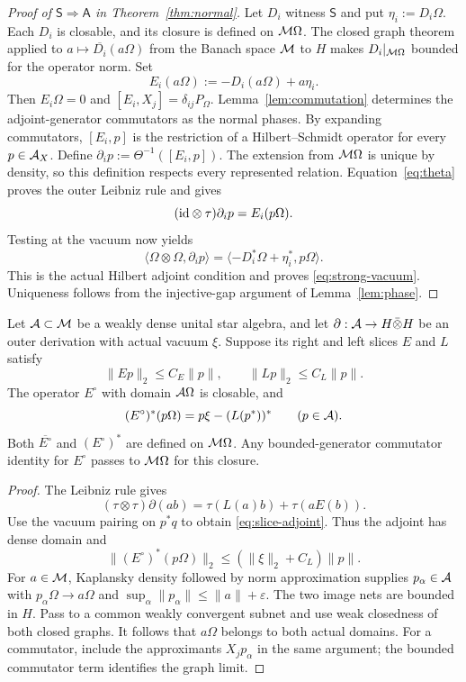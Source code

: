 \begin{proof}[Proof of $\mathsf S\Rightarrow\mathsf A$ in Theorem~\ref{thm:normal}]
Let $D_i$ witness $\mathsf S$ and put $\eta_i:=D_i\Omega$.
Each $D_i$ is closable, and its closure is defined on $\mathcal M\Omega$.
The closed graph theorem applied to $a\mapsto\overline{D_i}(a\Omega)$ from the Banach space $\mathcal M$ to $H$ makes $D_i|_{\mathcal M\Omega}$ bounded for the operator norm.
Set
\[
 E_i(a\Omega):=-D_i(a\Omega)+a\eta_i.
\]
Then $E_i\Omega=0$ and $[E_i,X_j]=\delta_{ij}P_\Omega$.
Lemma~\ref{lem:commutation} determines the adjoint-generator commutators as the normal phases.
By expanding commutators, $[E_i,p]$ is the restriction of a Hilbert--Schmidt operator for every $p\in\mathcal A_X$.
Define $\partial_i p:=\Theta^{-1}([E_i,p])$.
The extension from $\mathcal M\Omega$ is unique by density, so this definition respects every represented relation.
Equation~\eqref{eq:theta} proves the outer Leibniz rule and gives
\[
 (\mathrm{id}\otimes\tau)\partial_i p=E_i(p\Omega).
\]
Testing at the vacuum now yields
\[
 \langle\Omega\otimes\Omega,\partial_i p\rangle
 =\langle-D_i^*\Omega+\eta_i^*,p\Omega\rangle.
\]
This is the actual Hilbert adjoint condition and proves \eqref{eq:strong-vacuum}.
Uniqueness follows from the injective-gap argument of Lemma~\ref{lem:phase}.
\end{proof}

\begin{lemma}\label{lem:graph}
Let $\mathcal A\subset\mathcal M$ be a weakly dense unital star algebra, and let $\partial:\mathcal A\to H\bar\otimes H$ be an outer derivation with actual vacuum $\xi$.
Suppose its right and left slices $E$ and $L$ satisfy
\[
 \|Ep\|_2\le C_E\|p\|,\qquad \|Lp\|_2\le C_L\|p\|.
\]
The operator $E^\circ$ with domain $\mathcal A\Omega$ is closable, and
\begin{equation}\label{eq:slice-adjoint}
 (E^\circ)^*(p\Omega)=p\xi-(L(p^*))^*\qquad(p\in\mathcal A).
\end{equation}
Both $\overline{E^\circ}$ and $(E^\circ)^*$ are defined on $\mathcal M\Omega$.
Any bounded-generator commutator identity for $E^\circ$ passes to $\mathcal M\Omega$ for this closure.
\end{lemma}
\begin{proof}
The Leibniz rule gives
\[
 (\tau\otimes\tau)\partial(ab)=\tau(L(a)b)+\tau(aE(b)).
\]
Use the vacuum pairing on $p^*q$ to obtain \eqref{eq:slice-adjoint}.
Thus the adjoint has dense domain and
\[
 \|(E^\circ)^*(p\Omega)\|_2\le(\|\xi\|_2+C_L)\|p\|.
\]
For $a\in\mathcal M$, Kaplansky density followed by norm approximation supplies $p_\alpha\in\mathcal A$ with $p_\alpha\Omega\to a\Omega$ and $\sup_\alpha\|p_\alpha\|\le\|a\|+\varepsilon$.
The two image nets are bounded in $H$.
Pass to a common weakly convergent subnet and use weak closedness of both closed graphs.
It follows that $a\Omega$ belongs to both actual domains.
For a commutator, include the approximants $X_jp_\alpha$ in the same argument; the bounded commutator term identifies the graph limit.
\end{proof}

